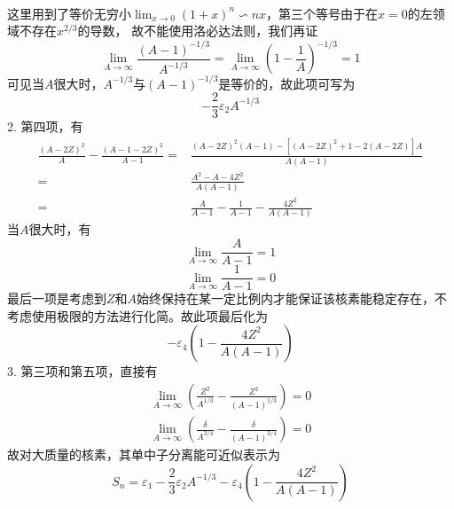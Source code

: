 \begin{exercise}
\begin{equation}
\begin{aligned}
        \end{aligned}
    \end{equation}
    这里用到了等价无穷小$\lim_{x \to 0}(1 + x)^{n} \backsim n x$，第三个等号由于在$x = 0$的左领域不存在$x^{2/3}$的导数，
    故不能使用洛必达法则，我们再证
    \begin{equation*}
        \lim_{A \to \infty} \frac{(A - 1)^{-1/3}}{A^{-1/3}} = \lim_{A \to \infty}\left(1 - \frac{1}{A}\right)^{-1/3}
        = 1
    \end{equation*}
    可见当$A$很大时，$A^{-1/3}$与$(A - 1)^{-1/3}$是等价的，故此项可写为
    $$-\frac{2}{3}\varepsilon_2 A^{-1/3}$$
    2. 第四项，有
    \begin{equation*}
        \begin{aligned}
            \frac{(A - 2Z)^2}{A} - \frac{(A - 1 - 2Z)^2}{A - 1}
            =& \frac{(A - 2Z)^2(A - 1) - [(A - 2Z)^2 + 1 - 2(A - 2Z)]A}{A(A - 1)} \\
            =& \frac{A^2 - A - 4Z^2}{A(A - 1)} \\
            =& \frac{A}{A - 1} - \frac{1}{A - 1} - \frac{4Z^2}{A(A - 1)}
        \end{aligned}
    \end{equation*}
    当$A$很大时，有
    $$\lim_{A \to \infty} \frac{A}{A - 1} = 1$$
    $$\lim_{A \to \infty} \frac{1}{A - 1} = 0$$
    最后一项是考虑到$Z$和$A$始终保持在某一定比例内才能保证该核素能稳定存在，不考虑使用极限的方法进行化简。故此项最后化为
    $$-\varepsilon_4(1 - \frac{4Z^2}{A(A - 1)})$$
    3. 第三项和第五项，直接有
    \begin{equation}
        \begin{aligned}
            \lim_{A \to \infty} \left(\frac{Z^2}{A^{1/3}} - \frac{Z^2}{(A - 1)^{1/3}}\right) = 0 \\
            \lim_{A \to \infty} \left(\frac{\delta}{A^{3/4}} - \frac{\delta}{(A - 1)^{3/4}}\right) = 0
        \end{aligned}
    \end{equation}
    故对大质量的核素，其单中子分离能可近似表示为
    $$S_n = \varepsilon_1 - \frac{2}{3}\varepsilon_2 A^{-1/3} - \varepsilon_4(1 - \frac{4Z^2}{A(A - 1)})$$
\end{exercise}

